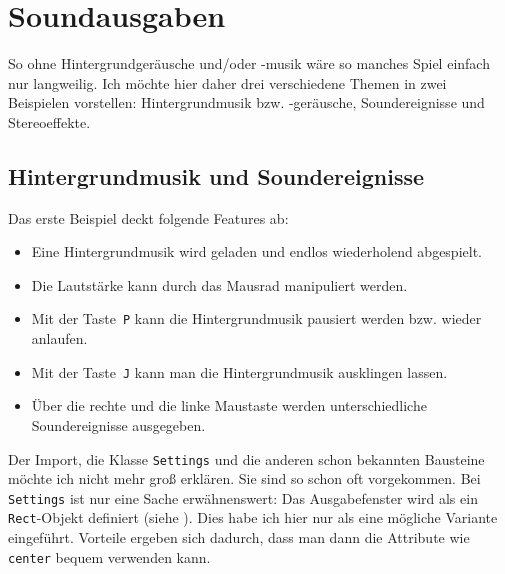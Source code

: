 \newpage
\section{Soundausgaben}
So ohne Hintergrundgeräusche und/oder -musik wäre so manches Spiel einfach nur langweilig. Ich möchte hier daher drei verschiedene Themen in zwei Beispielen vorstellen: Hintergrundmusik bzw. -geräusche, Soundereignisse und Stereoeffekte.

\subsection{Hintergrundmusik und Soundereignisse}

Das erste Beispiel deckt folgende Features ab:
\begin{itemize}
	\item Eine Hintergrundmusik wird geladen und endlos wiederholend abgespielt.
	
	\item Die Lautstärke kann durch das Mausrad manipuliert werden. 
	
	\item Mit der Taste~\texttt{P} kann die Hintergrundmusik pausiert werden bzw. wieder anlaufen.
	
	\item Mit der Taste~\texttt{J} kann man die Hintergrundmusik ausklingen lassen.
	
	\item Über die rechte und die linke Maustaste werden unterschiedliche Soundereignisse ausgegeben.
\end{itemize}

Der Import, die Klasse \texttt{Settings} und die anderen schon bekannten Bausteine möchte ich nicht mehr groß erklären. Sie sind so schon oft vorgekommen. Bei \texttt{Settings} ist nur eine Sache erwähnenswert: Das Ausgabefenster wird als ein \texttt{Rect}-Objekt definiert (siehe ). Dies habe ich hier nur als eine mögliche Variante eingeführt. Vorteile ergeben sich dadurch, dass man dann die Attribute wie \texttt{center} bequem verwenden kann.


